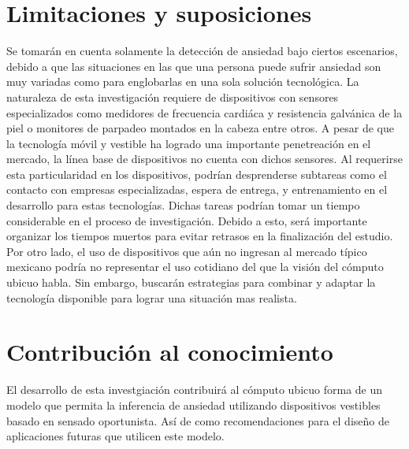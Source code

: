 \documentclass[letterpaper,12pt]{cicese}
\begin{document}
					\chapter{Limitaciones y suposiciones}
			Se tomar\'an en cuenta solamente la detecci\'on de ansiedad bajo ciertos escenarios, debido a que las situaciones en las que una persona puede sufrir ansiedad son muy variadas como para englobarlas en una sola soluci\'on tecnol\'ogica.
			La naturaleza de esta investigaci\'on requiere de dispositivos con sensores especializados como medidores de frecuencia cardi\'aca y resistencia galv\'anica de la piel o monitores de parpadeo montados en la cabeza entre otros. A pesar de que la tecnolog\'ia m\'ovil y vestible ha logrado una importante penetreaci\'on en el mercado, la l\'inea base de dispositivos no cuenta con dichos sensores. Al requerirse esta particularidad en los dispositivos, podr\'ian desprenderse subtareas como el contacto con empresas especializadas, espera de entrega, y entrenamiento en el desarrollo para estas tecnolog\'ias. Dichas tareas podr\'ian tomar un tiempo considerable en el proceso de investigaci\'on. Debido a esto, ser\'a importante organizar los tiempos muertos para evitar retrasos en la finalizaci\'on del estudio.
			Por otro lado, el uso de dispositivos que a\'un no ingresan al mercado t\'ipico mexicano podr\'ia no representar el uso cotidiano del que la visi\'on del  c\'omputo ubicuo habla. Sin embargo, buscar\'an estrategias para combinar y adaptar la tecnolog\'ia disponible para lograr una situaci\'on mas realista.
		\chapter{Contribuci\'on al conocimiento}
			El desarrollo de esta investgiaci\'on contribuir\'a al c\'omputo ubicuo forma de un modelo que permita la inferencia de ansiedad utilizando dispositivos vestibles basado en sensado oportunista. As\'i de como recomendaciones para el dise\~no de aplicaciones futuras que utilicen este modelo.
\end{document}
